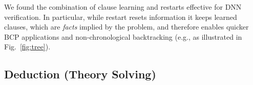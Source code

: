 \documentclass[oneside,11pt,dvipsnames]{book}
\numberwithin{equation}{section}
\theoremstyle{definition}
\theoremstyle{remark}
\newcommand{\tvn}[1]{\iftoggle{usecomment}{{\color{red}{[TVN]: #1}}}{}}
\newcommand{\mbd}[1]{\iftoggle{usecomment}{{\color{magenta}{[MBD]: #1}}}{}}
\newcommand{\tool}{\texttt{NeuralSAT}}
\begin{document}
We found the combination of clause learning and restarts effective for DNN verification. In particular, while restart resets information  it keeps learned clauses, which  are \emph{facts} implied by the problem, and therefore enables quicker BCP applications and non-chronological backtracking (e.g., as illustrated in Fig.~\ref{fig:tree}).





\subsection{Deduction (Theory Solving)}\label{sec:deduction}
\end{document}

